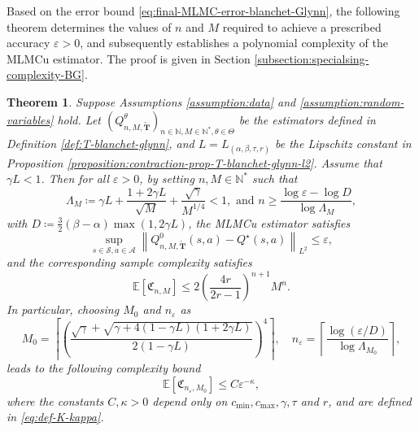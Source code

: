 \documentclass[11pt]{article}
\numberwithin{equation}{section}
\newtheorem{theorem}{Theorem}[section]
\theoremstyle{definition}
\theoremstyle{remark}
\def\N{{\mathbb{N}}}
\begin{document}
 
Based on 
the error bound
\eqref{eq:final-MLMC-error-blanchet-Glynn},
 the following theorem determines the values of 
$n$ and $M$   required to achieve a prescribed accuracy $\varepsilon>0$,
and subsequently establishes  a polynomial  complexity of 
the MLMCu estimator.
   The proof is given in Section \ref{subsection:specialsing-complexity-BG}.
 

\begin{theorem}
    \label{theorem:error-complexity-BG}
Suppose  Assumptions \ref{assumption:data} and   \ref{assumption:random-variables} hold.
Let  
$\left({Q}_{n,M, \tilde{\mathbf{T}}}^{\theta}\right)_{n\in \N, M\in \N^*,\theta\in \Theta}$
be the estimators 
defined in Definition \ref{def:T-blanchet-glynn},
and  $ L=L_{(\alpha,\beta,\tau,r)}$ be the Lipschitz constant  in Proposition \ref{proposition:contraction-prop-T-blanchet-glynn-l2}.
Assume that $\gamma L < 1$.
Then for all $\varepsilon > 0$,
by setting 
  $n , M \in \N^*$ such that 
   \begin{equation}
        \label{eq:conditions-M-n}
        \Lambda_M \coloneqq \gamma L + \frac{1 + 2 \gamma L}{\sqrt{M}} + \frac{\sqrt{\gamma}}{M^{1/4}} < 1, \text{ and  } n \geq \frac{\log \varepsilon - \log D}{\log \Lambda_M} ,
    \end{equation}
with  
 $D \coloneqq \frac{3}{2} (\beta - \alpha) \max(1,2 \gamma L)$,
 the MLMCu estimator 
 satisfies 
    \begin{equation}
        \label{eq:error-varepsilon}
        \sup_{s \in \mathcal S, a \in \mathcal A} \left\| Q^0_{n, M, \tilde{\mathbf T}}(s,a) - Q^{\star}(s,a) \right\|_{L^2} \leq \varepsilon,
    \end{equation}
    and the corresponding sample complexity satisfies 
    \begin{equation}
        \label{eq:sample-complexity-bound-expectation}
	\mathbb E [\mathfrak C_{n, M}] \leq 2 \left(
    \frac{4r}{ 2r - 1}
    \right)^{n+1} M^{n}.
    \end{equation}
   In particular, choosing 
         $ M_0$ and $n_\varepsilon$ as
    \[
        M_0 = \left\lceil \left(\frac{\sqrt{\gamma} + \sqrt{\gamma + 4(1 - \gamma L)(1 + 2\gamma L)}}{2(1- \gamma L)} \right)^4 \right\rceil , \quad n_\varepsilon = \left\lceil  \frac{\log (\varepsilon/D)}{\log \Lambda_{M_0}}\right\rceil,
    \]
    leads to the following complexity bound
    \begin{equation}
        \label{eq:sample-complexity-polynomial-complexity}
        \mathbb E [\mathfrak C_{n_\varepsilon, M_0}] \leq C \varepsilon^{- \kappa},
    \end{equation}
    where the constants $C, \kappa>0 $ depend only on $c_{\min}, c_{\max}, \gamma, \tau$ and $ r$, and are defined in \eqref{eq:def-K-kappa}.
\end{theorem}
\end{document}
